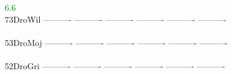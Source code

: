 \documentclass[11pt,twoside,reqno,a4paper]{article}
\begin{document}
{\hspace*{5\charwidth}\hspace*{7\charwidth}\hspace*{1\charwidth}\hspace*{1\charwidth}\hspace*{27\charwidth}\textcolor{Green}{6.6}\hspace*{1\charwidth}\hspace*{1\charwidth}\hspace*{1\charwidth}\hspace*{1\charwidth}\\
73\hspace*{3\charwidth}DroWil	----------	----------	----------	----------	----------	----------	\\
\hspace*{5\charwidth}\hspace*{7\charwidth}\hspace*{1\charwidth}\hspace*{1\charwidth}\hspace*{1\charwidth}\hspace*{1\charwidth}\hspace*{1\charwidth}\hspace*{1\charwidth}\\
53\hspace*{3\charwidth}DroMoj	----------	----------	----------	----------	----------	----------	\\
\hspace*{5\charwidth}\hspace*{7\charwidth}\hspace*{1\charwidth}\hspace*{1\charwidth}\hspace*{1\charwidth}\hspace*{1\charwidth}\hspace*{1\charwidth}\hspace*{1\charwidth}\\
52\hspace*{3\charwidth}DroGri	----------	----------	----------	----------	----------	----------	\\
\hspace*{5\charwidth}\hspace*{7\charwidth}\hspace*{1\charwidth}\hspace*{1\charwidth}\hspace*{1\charwidth}\hspace*{1\charwidth}\hspace*{1\charwidth}\hspace*{1\charwidth}\\
}
\end{document}
